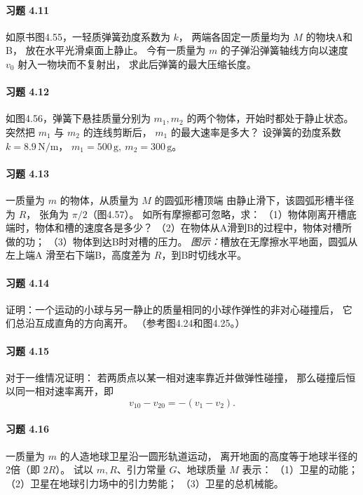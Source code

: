 \paragraph{习题 4.11}
如原书图4.55，一轻质弹簧劲度系数为 \(k\)，
两端各固定一质量均为 \(M\) 的物块A和B，
放在水平光滑桌面上静止。
今有一质量为 \(m\) 的子弹沿弹簧轴线方向以速度 \(v_0\)
射入一物块而不复射出，
求此后弹簧的最大压缩长度。

\paragraph{习题 4.12}
如图4.56，弹簧下悬挂质量分别为 \(m_1,m_2\)
的两个物体，开始时都处于静止状态。
突然把 \(m_1\) 与 \(m_2\) 的连线剪断后，
\(m_1\) 的最大速率是多大？
设弹簧的劲度系数
\(k=8.9\,\mathrm{N/m}\)，
\(m_1=500\,\mathrm g,\ m_2=300\,\mathrm g\)。

\paragraph{习题 4.13}
一质量为 \(m\) 的物体，从质量为 \(M\) 的圆弧形槽顶端
由静止滑下，该圆弧形槽半径为 \(R\)，
张角为 \(\pi/2\)（图4.57）。
如所有摩擦都可忽略，求：
（1）物体刚离开槽底端时，物体和槽的速度各是多少？
（2）在物体从A滑到B的过程中，物体对槽所做的功；
（3）物体到达B时对槽的压力。
\textit{图示：}槽放在无摩擦水平地面，圆弧从左上端A
滑至右下端B，高度差为 \(R\)，到B时切线水平。

\paragraph{习题 4.14}
证明：一个运动的小球与另一静止的质量相同的小球作弹性的非对心碰撞后，
它们总沿互成直角的方向离开。
（参考图4.24和图4.25。）

\paragraph{习题 4.15}
对于一维情况证明：
若两质点以某一相对速率靠近并做弹性碰撞，
那么碰撞后恒以同一相对速率离开，即
\[
 v_{10}-v_{20}=-(v_1-v_2).
\]

\paragraph{习题 4.16}
一质量为 \(m\) 的人造地球卫星沿一圆形轨道运动，
离开地面的高度等于地球半径的2倍（即 \(2R\)）。
试以 \(m,R\)、引力常量 \(G\)、地球质量 \(M\) 表示：
（1）卫星的动能；
（2）卫星在地球引力场中的引力势能；
（3）卫星的总机械能。

